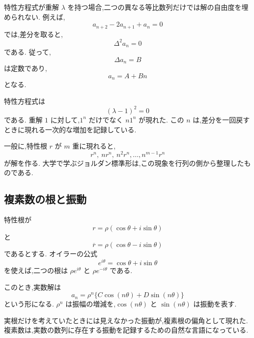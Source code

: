特性方程式が重解 $\lambda$ を持つ場合,二つの異なる等比数列だけでは解の自由度を埋められない.
例えば,
\[
  a_{n+2}-2a_{n+1}+a_n=0
\]
では,差分を取ると,
\[
  \Delta^2a_n=0
\]
である.
従って,
\[
  \Delta a_n=B
\]
は定数であり,
\[
  a_n=A+Bn
\]
となる.

特性方程式は
\[
  (\lambda-1)^2=0
\]
である.
重解 $1$ に対して,$1^n$ だけでなく $n1^n$ が現れた.
この $n$ は,差分を一回戻すときに現れる一次的な増加を記録している.

一般に,特性根 $r$ が $m$ 重に現れると,
\[
  r^n,\ nr^n,\ n^2r^n,\ldots,n^{m-1}r^n
\]
が解を作る.
大学で学ぶジョルダン標準形は,この現象を行列の側から整理したものである.

\subsection{複素数の根と振動}

特性根が
\[
  r=\rho(\cos\theta+i\sin\theta)
\]
と
\[
  \overline r=\rho(\cos\theta-i\sin\theta)
\]
であるとする.
オイラーの公式
\[
  e^{i\theta}=\cos\theta+i\sin\theta
\]
を使えば,二つの根は $\rho e^{i\theta}$ と $\rho e^{-i\theta}$ である.

このとき,実数解は
\[
  a_n=\rho^n\{C\cos(n\theta)+D\sin(n\theta)\}
\]
という形になる.
$\rho^n$ は振幅の増減を,$\cos(n\theta)$ と $\sin(n\theta)$ は振動を表す.

実根だけを考えていたときには見えなかった振動が,複素根の偏角として現れた.
複素数は,実数の数列に存在する振動を記録するための自然な言語になっている.

